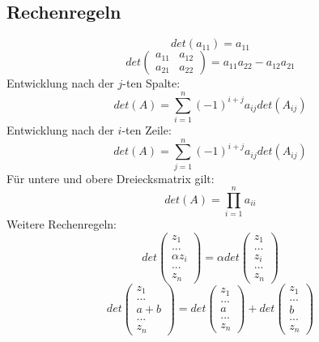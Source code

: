 \documentclass[a4paper,twocolumn,10pt]{article}
\begin{document}
\subsection{Rechenregeln}
\begin{equation*}
det(a_{11})=a_{11}
\end{equation*}
\begin{equation*}
det\begin{pmatrix}a_{11} & a_{12} \\ a_{21} & a_{22}\end{pmatrix}=a_{11}a_{22}-a_{12}a_{21}
\end{equation*}
Entwicklung nach der $j$-ten Spalte:
\begin{equation*}
det(A)=\sum\limits_{i=1}^{n}(-1)^{i+j}a_{ij}det(A_{ij})
\end{equation*}
Entwicklung nach der $i$-ten Zeile:
\begin{equation*}
det(A)=\sum\limits_{j=1}^{n}(-1)^{i+j}a_{ij}det(A_{ij})
\end{equation*}
Für untere und obere Dreiecksmatrix gilt:
\begin{equation*}
det(A)=\prod\limits_{i=1}^{n}a_{ii}
\end{equation*}
Weitere Rechenregeln:
\begin{equation*}
det\begin{pmatrix}z_1 \\ ... \\ \alpha z_i \\ ... \\ z_n\end{pmatrix}=\alpha det\begin{pmatrix}z_1 \\ ... \\ z_i \\ ... \\ z_n\end{pmatrix}
\end{equation*}
\begin{equation*}
det\begin{pmatrix}z_1 \\ ... \\ a+b \\ ... \\ z_n\end{pmatrix}=det\begin{pmatrix}z_1 \\ ... \\ a \\ ... \\ z_n\end{pmatrix}+det\begin{pmatrix}z_1 \\ ... \\ b \\ ... \\ z_n\end{pmatrix}
\end{equation*}
\end{document}
